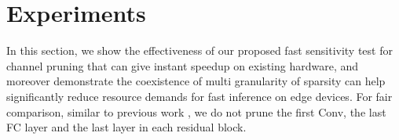 \documentclass{article}
\begin{document}



\section{Experiments}

In this section, we show the effectiveness of our proposed fast sensitivity test for channel pruning that can give instant speedup on existing hardware, and moreover demonstrate the coexistence of multi granularity of sparsity can help significantly reduce resource demands for fast inference on edge devices. %
For fair comparison, similar to previous work \cite{Li2016PruningFF}\cite{luo2017thinet}, we do not prune the first Conv, the last FC layer and the last layer in each residual block. 
\end{document}
